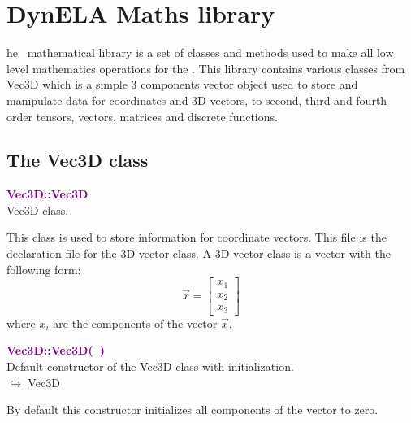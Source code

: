 %
%
%
\chapter{DynELA Maths library}

\startcontents[chapters]
\printmyminitoc[2]he \DynELA~mathematical library is a set of classes and methods used to make all low level mathematics operations for the \DynELA. This library contains various classes from Vec3D which is a simple 3 components vector object used to store and manipulate data for coordinates and 3D vectors, to second, third and fourth order tensors, vectors, matrices and discrete functions.

\section{The Vec3D class}

\textcolor{purple}{\textbf{Vec3D::Vec3D}}\label{Vec3D::Vec3D}\\
Vec3D class.

This class is used to store information for coordinate vectors.
This file is the declaration file for the 3D vector class.
A 3D vector class is a vector with the following form:
\begin{equation*}
\overrightarrow{x}=\left[\begin{array}{c}
  x_{1}\\
  x_{2}\\
  x_{3}
  \end{array}\right]
\end{equation*}
where $x_{i}$ are the components of the vector $\overrightarrow{x}$.

\textcolor{purple}{\textbf{Vec3D::Vec3D(~)}}\label{Vec3D::Vec3D()}\\
Default constructor of the Vec3D class with initialization.\\ \hspace*{10mm}$\hookrightarrow$ Vec3D

By default this constructor initializes all components of the vector to zero.

